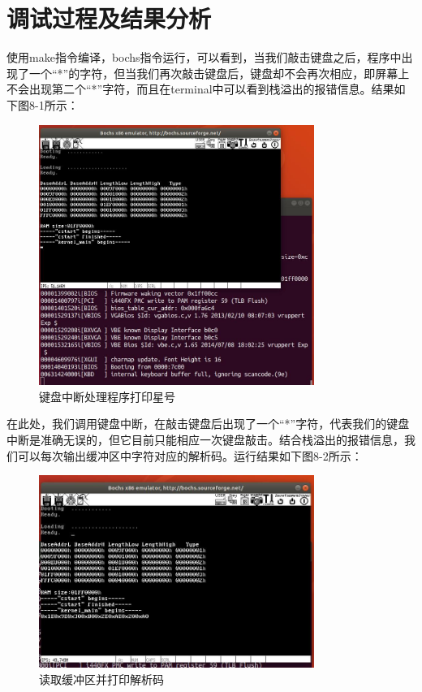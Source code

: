 \section{调试过程及结果分析}
使用make指令编译，bochs指令运行，可以看到，当我们敲击键盘之后，程序中出现了一个“*”的字符，但当我们再次敲击键盘后，键盘却不会再次相应，即屏幕上不会出现第二个“*”字符，而且在terminal中可以看到栈溢出的报错信息。结果如下图8-1所示：
\begin{figure}[H]
  \centering
  \includegraphics[width=0.8\textwidth]{figures/chapter8/8-1.jpg}
  \caption{键盘中断处理程序打印星号}
  \label{fig:1}
\end{figure}

在此处，我们调用键盘中断，在敲击键盘后出现了一个“*”字符，代表我们的键盘中断是准确无误的，但它目前只能相应一次键盘敲击。结合栈溢出的报错信息，我们可以每次输出缓冲区中字符对应的解析码。运行结果如下图8-2所示：
\begin{figure}[H]
  \centering
  \includegraphics[width=0.8\textwidth]{figures/chapter8/8-2.jpg}
  \caption{读取缓冲区并打印解析码}
  \label{fig:2}
\end{figure}

